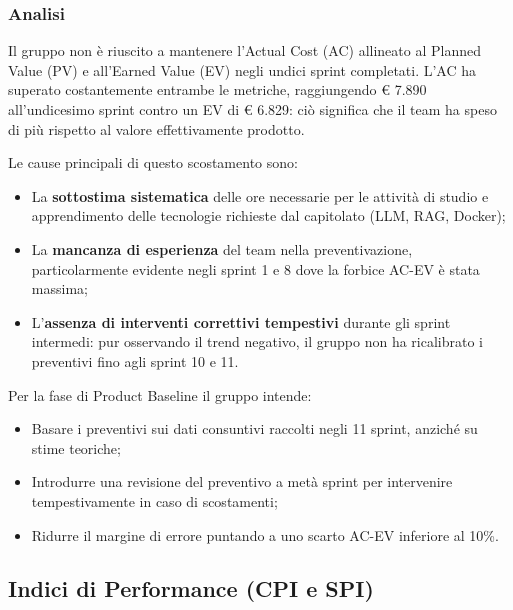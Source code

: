 \documentclass[a4paper,11pt,oneside]{scrartcl}
\begin{document}
\subsubsection*{Analisi}

Il gruppo non è riuscito a mantenere l'Actual Cost (AC) allineato al Planned Value (PV) e all'Earned Value (EV) negli undici sprint completati. L'AC ha superato costantemente entrambe le metriche, raggiungendo \euro{} 7.890 all'undicesimo sprint contro un EV di \euro{} 6.829: ciò significa che il team ha speso di più rispetto al valore effettivamente prodotto.

Le cause principali di questo scostamento sono:
\begin{itemize}
    \item La \textbf{sottostima sistematica} delle ore necessarie per le attività di studio e apprendimento delle tecnologie richieste dal capitolato (LLM, RAG, Docker);
    \item La \textbf{mancanza di esperienza} del team nella preventivazione, particolarmente evidente negli sprint 1 e 8 dove la forbice AC-EV è stata massima;
    \item L'\textbf{assenza di interventi correttivi tempestivi} durante gli sprint intermedi: pur osservando il trend negativo, il gruppo non ha ricalibrato i preventivi fino agli sprint 10 e 11.
\end{itemize}

Per la fase di Product Baseline il gruppo intende:
\begin{itemize}
    \item Basare i preventivi sui dati consuntivi raccolti negli 11 sprint, anziché su stime teoriche;
    \item Introdurre una revisione del preventivo a metà sprint per intervenire tempestivamente in caso di scostamenti;
    \item Ridurre il margine di errore puntando a uno scarto AC-EV inferiore al 10\%.
\end{itemize}

\subsection{Indici di Performance (CPI e SPI)}
\end{document}
